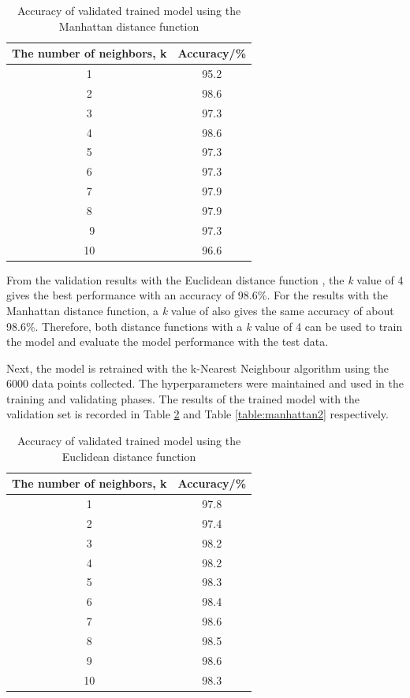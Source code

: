\begin{table}[ht]
\centering
\begin{center}
\begin{tabular}{ |c|c| } 
  \hline
 The number of neighbors, k  & Accuracy/\%\\ 
  \hline\hline
1 & 95.2\\ 
2 & 98.6\\ 
3 & 97.3\\ 
4 & 98.6\\ 
5 & 97.3\\ 
6 & 97.3\\ 
7 & 97.9\\ 
8 & 97.9\\\ 
9 & 97.3\\ 
10 & 96.6\\ 

 \hline
\end{tabular}
\caption{Accuracy of validated trained model using the Manhattan distance function}
\label{table:manhattan}
\end{center}
\end{table}
 
From the validation results with the Euclidean distance function , the \textit{k} value of 4 gives the best performance with an accuracy of 98.6\%. For the results with the Manhattan distance function, a \textit{k} value of also gives the same accuracy of about 98.6\%. Therefore, both distance functions with a \textit{k} value of 4 can be used to train the model and evaluate the model performance with the test data.


Next, the model is retrained with the k-Nearest Neighbour algorithm using the 6000 data points collected. The hyperparameters were maintained and used in the training and validating phases. The results of the trained model with the validation set is recorded in Table \ref{table:euclidean2} and Table \ref{table:manhattan2} respectively.
\begin{table}[ht]
\centering
\begin{center}
\begin{tabular}{ |c|c| } 
  \hline
 The number of neighbors, k  & Accuracy/\%\\ 
  \hline\hline
1 & 97.8\\ 
2 & 97.4\\ 
3 & 98.2\\ 
4 & 98.2\\ 
5 & 98.3\\ 
6 & 98.4\\ 
7 & 98.6\\ 
8 & 98.5\\ 
9 & 98.6\\ 
10 & 98.3\\ 
\hline
\end{tabular}
\caption{Accuracy of validated trained model using the Euclidean distance function }
\label{table:euclidean2}
\end{center}
\end{table}

